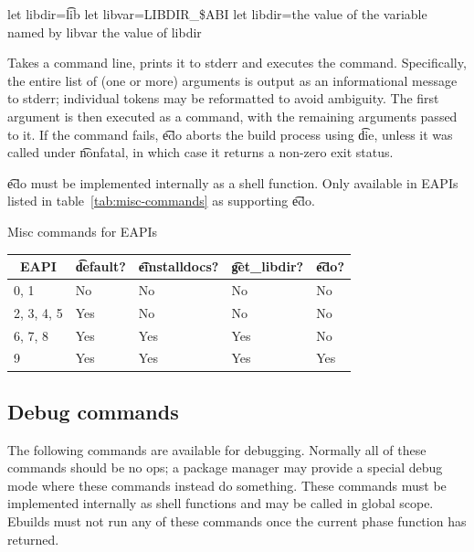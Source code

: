\begin{description}
\begin{algorithm}
\caption{Library directory logic} \label{alg:get-libdir}
\begin{algorithmic}[1]
\STATE let libdir=\t{lib}
    \STATE let libvar=LIBDIR_\$ABI
        \STATE let libdir=the value of the variable named by libvar
    \ENDIF
\ENDIF
\RETURN the value of libdir
\end{algorithmic}
\end{algorithm}

\item[edo]  Takes a command line, prints it to stderr and executes the command.
Specifically, the entire list of (one or more) arguments is output as an informational message
to stderr; individual tokens may be reformatted to avoid ambiguity. The first argument is then
executed as a command, with the remaining arguments passed to it. If the command fails, \t{edo}
aborts the build process using \t{die}, unless it was called under \t{nonfatal}, in which case it
returns a non-zero exit status.

\t{edo} must be implemented internally as a shell function. Only available in EAPIs listed in
table~\ref{tab:misc-commands} as supporting \t{edo}.

\end{description}

\begin{centertable}{Misc commands for EAPIs}
    \label{tab:misc-commands}
    \begin{tabular}{lllll}
      \toprule
      \multicolumn{1}{c}{\textbf{EAPI}} &
      \multicolumn{1}{c}{\textbf{\t{default}?}} &
      \multicolumn{1}{c}{\textbf{\t{einstalldocs}?}} &
      \multicolumn{1}{c}{\textbf{\t{get_libdir}?}} &
      \multicolumn{1}{c}{\textbf{\t{edo}?}} \\
      \midrule
      0, 1              & No  & No  & No  & No  \\
      2, 3, 4, 5        & Yes & No  & No  & No  \\
      6, 7, 8           & Yes & Yes & Yes & No  \\
      9                 & Yes & Yes & Yes & Yes \\
      \bottomrule
    \end{tabular}
\end{centertable}

\subsection{Debug commands}
The following commands are available for debugging. Normally all of these commands should be no ops;
a package manager may provide a special debug mode where these commands instead do something.
These commands must be implemented internally as shell functions and may be called in global scope.
Ebuilds must not run any of these commands once the current phase function has returned.

